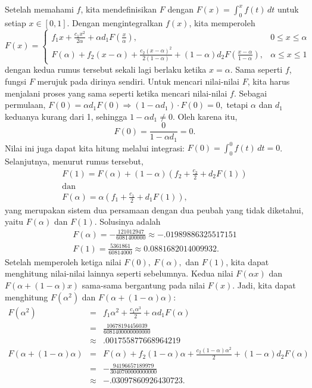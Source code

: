 Setelah memahami $f$, kita mendefinisikan $F$ dengan $F(x)=\int_{0}^{x}f(t)\,dt$
untuk setiap $x\in[0,1]$. Dengan mengintegralkan $f(x)$, kita memperoleh
\[
F(x)=\begin{cases}
f_{1}x+\frac{c_{1}x^{2}}{2\alpha}+\alpha d_{1}F\left(\frac{x}{\alpha}\right), & 0\leq x\leq\alpha\\
F(\alpha)+f_{2}\left(x-\alpha\right)+\frac{c_{2}\left(x-\alpha\right)^{2}}{2(1-\alpha)}+(1-\alpha)d_{2}F\left(\frac{x-\alpha}{1-\alpha}\right), & \alpha\leq x\leq1
\end{cases}
\]
dengan kedua rumus tersebut sekali lagi berlaku ketika $x=\alpha$.
Sama seperti $f$, fungsi $F$ merujuk pada dirinya sendiri. Untuk
mencari nilai-nilai $F$, kita harus menjalani proses yang sama seperti
ketika mencari nilai-nilai $f$. Sebagai permulaan, $F(0)=\alpha d_{1}F(0)\Rightarrow(1-\alpha d_{1})\cdot F(0)=0,$
tetapi $\alpha$ dan $d_{1}$ keduanya kurang dari 1, sehingga $1-\alpha d_{1}\neq0$.
Oleh karena itu,
\[
F(0)=\frac{0}{1-\alpha d_{1}}=0.
\]
Nilai ini juga dapat kita hitung melalui integrasi: $F(0)=\int_{0}^{0}f(t)\,dt=0$.
Selanjutnya, menurut rumus tersebut,
\[
\begin{gathered}F(1)=F(\alpha)+(1-\alpha)\left(f_{2}+\frac{c_{2}}{2}+d_{2}F(1)\right)\\
\mbox{dan}\\
F(\alpha)=\alpha\left(f_{1}+\frac{c_{1}}{2}+d_{1}F(1)\right),
\end{gathered}
\]
yang merupakan sistem dua persamaan dengan dua peubah yang tidak diketahui,
yaitu $F(\alpha)$ dan $F(1)$. Solusinya adalah
\[
\begin{gathered}F(\alpha)=-\frac{121012947}{6081400000}\approx-.01989886325517151\\
F(1)=\frac{5361861}{60814000}\approx0.0881682014009932.
\end{gathered}
\]
Setelah memperoleh ketiga nilai $F(0),\ F(\alpha),$ dan $F(1)$,
kita dapat menghitung nilai-nilai lainnya seperti sebelumnya. Kedua
nilai $F(\alpha x)$ dan $F(\alpha+(1-\alpha)x)$ sama-sama bergantung
pada nilai $F(x)$. Jadi, kita dapat menghitung $F(\alpha^{2})$ dan
$F(\alpha+(1-\alpha)\alpha)$: 
\begin{eqnarray*}
F(\alpha^{2}) & = & f_{1}\alpha^{2}+\frac{c_{1}\alpha^{3}}{2}+\alpha d_{1}F\left(\alpha\right)\\
 & = & \frac{10678194456039}{6081400000000000}\\
 & \approx & .001755877668964219\\
F(\alpha+(1-\alpha)\alpha) & = & F(\alpha)+f_{2}\left(1-\alpha\right)\alpha+\frac{c_{2}\left(1-\alpha\right)\alpha^{2}}{2}+(1-\alpha)d_{2}F\left(\alpha\right)\\
 & = & -\frac{94196657189979}{3040700000000000}\\
 & \approx & -.03097860926430723.
\end{eqnarray*}
